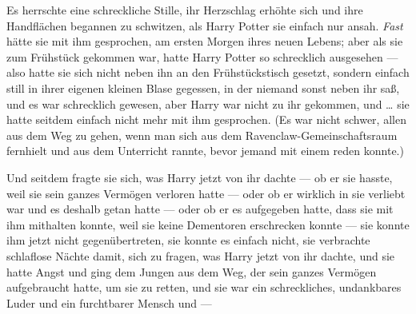 Es herrschte eine schreckliche Stille, ihr Herzschlag erhöhte sich und ihre Handflächen begannen zu schwitzen, als Harry Potter sie einfach nur ansah. \emph{Fast} hätte sie mit ihm gesprochen, am ersten Morgen ihres neuen Lebens; aber als sie zum Frühstück gekommen war, hatte Harry Potter so schrecklich ausgesehen — also hatte sie sich nicht neben ihn an den Frühstückstisch gesetzt, sondern einfach still in ihrer eigenen kleinen Blase gegessen, in der niemand sonst neben ihr saß, und es war schrecklich gewesen, aber Harry war nicht zu ihr gekommen, und … sie hatte seitdem einfach nicht mehr mit ihm gesprochen.
(Es war nicht schwer, allen aus dem Weg zu gehen, wenn man sich aus dem Ravenclaw-Gemeinschaftsraum fernhielt und aus dem Unterricht rannte, bevor jemand mit einem reden konnte.)

Und seitdem fragte sie sich, was Harry jetzt von ihr dachte — ob er sie hasste, weil sie sein ganzes Vermögen verloren hatte — oder ob er wirklich in sie verliebt war und es deshalb getan hatte — oder ob er es aufgegeben hatte, dass sie mit ihm mithalten konnte, weil sie keine Dementoren erschrecken konnte — sie konnte ihm jetzt nicht gegenübertreten, sie konnte es einfach nicht, sie verbrachte schlaflose Nächte damit, sich zu fragen, was Harry jetzt von ihr dachte, und sie hatte Angst und ging dem Jungen aus dem Weg, der sein ganzes Vermögen aufgebraucht hatte, um sie zu retten, und sie war ein schreckliches, undankbares Luder und ein furchtbarer Mensch und —

